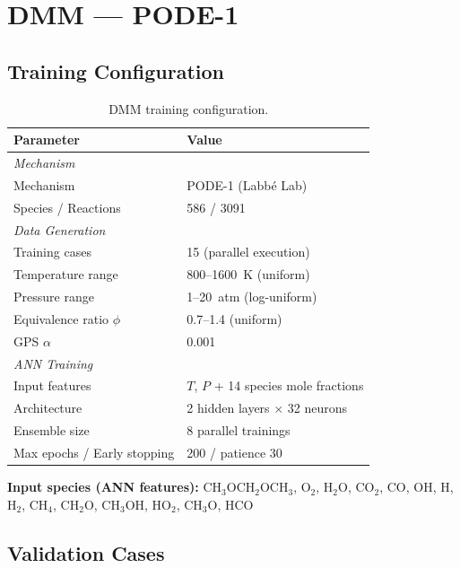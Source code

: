 \documentclass[11pt,a4paper]{article}
\begin{document}
\section{DMM --- PODE-1}
\label{sec:dmm}

\subsection{Training Configuration}

\begin{table}[H]
\centering
\caption{DMM training configuration.}
\label{tab:dmm_config}
\begin{tabular}{ll}
\toprule
\textbf{Parameter} & \textbf{Value} \\
\midrule
\multicolumn{2}{l}{\textit{Mechanism}} \\
\quad Mechanism & PODE-1 (Labb\'{e} Lab) \\
\quad Species / Reactions & 586 / 3091 \\
\midrule
\multicolumn{2}{l}{\textit{Data Generation}} \\
\quad Training cases & 15 (parallel execution) \\
\quad Temperature range & 800--1600~K (uniform) \\
\quad Pressure range & 1--20~atm (log-uniform) \\
\quad Equivalence ratio $\phi$ & 0.7--1.4 (uniform) \\
\quad GPS $\alpha$ & 0.001 \\
\midrule
\multicolumn{2}{l}{\textit{ANN Training}} \\
\quad Input features & $T$, $P$ + 14 species mole fractions \\
\quad Architecture & 2 hidden layers $\times$ 32 neurons \\
\quad Ensemble size & 8 parallel trainings \\
\quad Max epochs / Early stopping & 200 / patience 30 \\
\bottomrule
\end{tabular}
\end{table}

\textbf{Input species (ANN features):} CH$_3$OCH$_2$OCH$_3$, O$_2$, H$_2$O, CO$_2$, CO, OH, H, H$_2$, CH$_4$, CH$_2$O, CH$_3$OH, HO$_2$, CH$_3$O, HCO

\subsection{Validation Cases}
\end{document}

